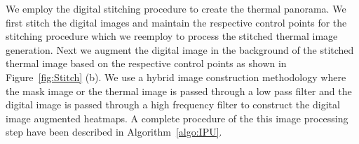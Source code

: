 We employ the digital stitching procedure to create the thermal panorama. We first stitch the digital images and maintain the respective control points for the stitching procedure which we reemploy to process the stitched thermal image generation. Next we augment the digital image in the background of the stitched thermal image based on the respective control points as shown in Figure~\ref{fig:Stitch} (b). We use a hybrid image construction methodology where the mask image or the thermal image is passed through a low pass filter and the digital image is passed through a high frequency filter to construct the digital image augmented heatmaps. A complete procedure of the this image processing step have been described in Algorithm~\ref{algo:IPU}.



